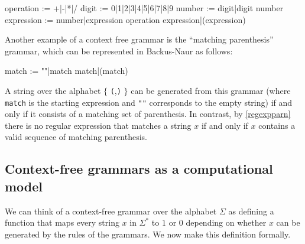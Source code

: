 \begin{code}
operation  := +|-|*|/
digit      := 0|1|2|3|4|5|6|7|8|9
number     := digit|digit number
expression := number|expression operation expression|(expression)
\end{code}

Another example of a context free grammar is the ``matching
parenthesis'' grammar, which can be represented in Backus-Naur as
follows:

\begin{code}
match  := ""|match match|(match)
\end{code}

A string over the alphabet \(\{\) \texttt{(},\texttt{)} \(\}\) can be
generated from this grammar (where \texttt{match} is the starting
expression and \texttt{""} corresponds to the empty string) if and only
if it consists of a matching set of parenthesis. In contrast, by
\cref{regexpparn} there is no regular expression that matches a string
\(x\) if and only if \(x\) contains a valid sequence of matching
parenthesis.

\subsection{Context-free grammars as a computational
model}\label{Context-free-grammars-as-}

We can think of a context-free grammar over the alphabet \(\Sigma\) as
defining a function that maps every string \(x\) in \(\Sigma^*\) to
\(1\) or \(0\) depending on whether \(x\) can be generated by the rules
of the grammars. We now make this definition formally.

